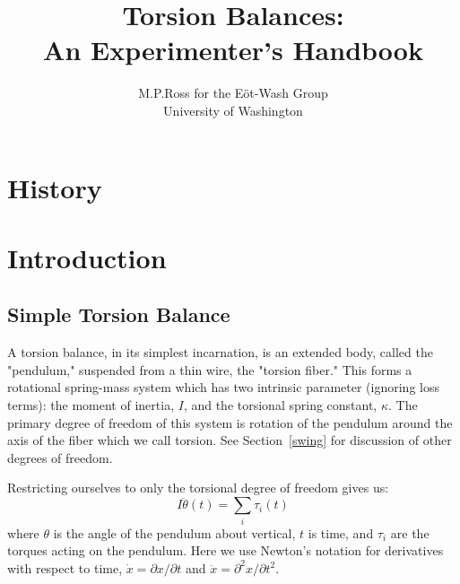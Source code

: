 \documentclass{book}
\begin{document}
\title{Torsion Balances:\\An Experimenter's Handbook}
\author{M.P.Ross for the E\"ot-Wash Group \\ University of Washington}

\maketitle

\tableofcontents

\setcounter{chapter}{-1}
\chapter{History}
\chapter{Introduction}
\section{Simple Torsion Balance}\label{simple}

\quad A torsion balance, in its simplest incarnation, is an extended body, called the "pendulum," suspended from a thin wire, the "torsion fiber." This forms a rotational spring-mass system which has two intrinsic parameter (ignoring loss terms): the moment of inertia, $I$, and the torsional spring constant, $\kappa$. The primary degree of freedom of this system is rotation of the pendulum around the axis of the fiber which we call torsion. See Section~\ref{swing} for discussion of other degrees of freedom.

Restricting ourselves to only the torsional degree of freedom gives us:
\begin{equation}
I \ddot{\theta}(t)=\sum_i \tau_i(t)
\end{equation}
where $\theta$ is the angle of the pendulum about vertical, $t$ is time, and $\tau_i$ are the torques acting on the pendulum. Here we use Newton's notation for derivatives with respect to time, $\dot{x}=\partial x/\partial t$ and $\ddot{x}=\partial^2 x/\partial t^2$. 
\end{document}
